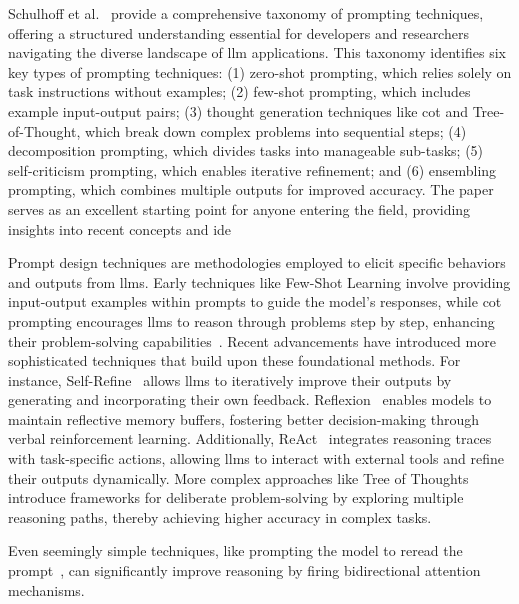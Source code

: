 \documentclass[12pt,twoside,english]{article}
\begin{document}
Schulhoff et al.~\cite{schulhoff2024promptreportsystematicsurvey} provide a comprehensive taxonomy of prompting techniques, offering a structured understanding essential for developers and researchers navigating the diverse landscape of \gls{llm} applications. This taxonomy identifies six key types of prompting techniques: (1) zero-shot prompting, which relies solely on task instructions without examples; (2) few-shot prompting, which includes example input-output pairs; (3) thought generation techniques like \gls{cot} and Tree-of-Thought, which break down complex problems into sequential steps; (4) decomposition prompting, which divides tasks into manageable sub-tasks; (5) self-criticism prompting, which enables iterative refinement; and (6) ensembling prompting, which combines multiple outputs for improved accuracy. The paper~\cite{schulhoff2024promptreportsystematicsurvey} serves as an excellent starting point for anyone entering the field, providing insights
into recent concepts and ide

Prompt design techniques are methodologies employed to elicit specific behaviors and outputs from \glspl{llm}. Early techniques like Few-Shot Learning involve providing input-output examples within prompts to guide the model's responses, while \gls{cot} prompting encourages \glspl{llm} to reason through problems step by step, enhancing their problem-solving capabilities~\cite{wei2023chainofthoughtpromptingelicitsreasoning}. Recent advancements have introduced more sophisticated techniques that build upon these foundational methods. For instance, Self-Refine~\cite{madaan2023selfrefineiterativerefinementselffeedback} allows \glspl{llm} to iteratively improve their outputs by generating and incorporating their own feedback. Reflexion~\cite{shinn2023reflexionlanguageagentsverbal} enables models to maintain reflective memory buffers, fostering better decision-making through verbal reinforcement learning. Additionally, ReAct~\cite{yao2023reactsynergizingreasoningacting} integrates reasoning traces with task-specific actions, allowing \glspl{llm} to interact with external tools and refine their outputs dynamically. More complex approaches like Tree of Thoughts~\cite{yao2023treethoughtsdeliberateproblem} introduce frameworks for deliberate problem-solving by exploring multiple reasoning paths, thereby achieving higher accuracy in complex tasks.

Even seemingly simple techniques, like prompting the model to reread the prompt~\cite{xu2024rereadingimprovesreasoninglarge}, can significantly improve reasoning by firing bidirectional attention mechanisms.
\end{document}
